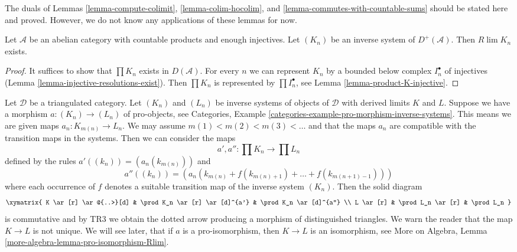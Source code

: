 \noindent
The duals of Lemmas \ref{lemma-compute-colimit},
\ref{lemma-colim-hocolim}, and
\ref{lemma-commutes-with-countable-sums}
should be stated here and proved. However, we do not know any applications
of these lemmas for now.

\begin{lemma}
\label{lemma-inverse-limit-bounded-below}
Let $\mathcal{A}$ be an abelian category with countable products and
enough injectives. Let $(K_n)$ be an inverse system of $D^+(\mathcal{A})$.
Then $R\lim K_n$ exists.
\end{lemma}

\begin{proof}
It suffices to show that $\prod K_n$ exists in $D(\mathcal{A})$.
For every $n$ we can represent $K_n$ by a bounded below complex
$I_n^\bullet$ of injectives (Lemma \ref{lemma-injective-resolutions-exist}).
Then $\prod K_n$ is represented by $\prod I_n^\bullet$, see
Lemma \ref{lemma-product-K-injective}.
\end{proof}

\begin{remark}
\label{remark-functoriality-derived-limit}
Let $\mathcal{D}$ be a triangulated category. Let $(K_n)$ and $(L_n)$ be
inverse systems of objects of $\mathcal{D}$ with derived limits $K$ and $L$.
Suppose we have a morphism $a : (K_n) \to (L_n)$ of pro-objects, see
Categories, Example \ref{categories-example-pro-morphism-inverse-systems}.
This means we are given maps $a_n : K_{m(n)} \to L_n$. We may assume
$m(1) < m(2) < m(3) < \ldots$ and that the maps $a_n$ are compatible
with the transition maps in the systems. Then we can consider the maps
$$
a', a'' : \prod K_n \longrightarrow \prod L_n
$$
defined by the rules $a'((k_n)) = (a_n(k_{m(n)}))$ and
$$
a''((k_n)) =
(a_n(k_{m(n)} + f(k_{m(n) + 1}) + \ldots + f(k_{m(n + 1) - 1})))
$$
where each occurrence of $f$ denotes a suitable transition map of
the inverse system $(K_n)$. Then the solid diagram
$$
\xymatrix{
K \ar[r] \ar@{..>}[d] & \prod K_n \ar[r] \ar[d]^{a'} &
\prod K_n \ar[d]^{a''} \\
L \ar[r] & \prod L_n \ar[r] & \prod L_n
}
$$
is commutative and by TR3 we obtain the dotted arrow producing
a morphism of distinguished triangles. We warn the reader that
the map $K \to L$ is not unique. We will see later, that if $a$
is a pro-isomorphism, then $K \to L$ is an isomorphism, see
More on Algebra, Lemma \ref{more-algebra-lemma-pro-isomorphism-Rlim}.
\end{remark}


